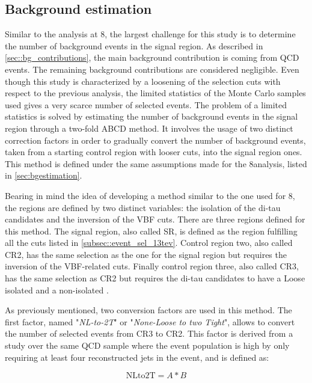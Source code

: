 \subsection{Background estimation}

Similar to the analysis at 8\tev, the largest challenge for this study is to determine the number of background events in the signal region. As described in \autoref{sec::bg_contributions}, the main background contribution is coming from QCD events. The remaining background contributions are considered negligible. Even though this study is characterized by a loosening of the selection cuts with respect to the previous analysis, the limited statistics of the Monte Carlo samples used gives a very scarce number of selected events. The problem of a limited statistics is solved by estimating the number of background events in the signal region through a two-fold ABCD method. It involves the usage of two distinct correction factors in order to gradually convert the number of background events, taken from a starting control region with looser cuts, into the signal region ones. This method is defined under the same assumptions made for the 8\tev analysis, listed in \autoref{sec:bgestimation}.

Bearing in mind the idea of developing a method similar to the one used for 8\tev, the regions are defined by two distinct variables: the isolation of the di-tau candidates and the inversion of the VBF cuts. There are three regions defined for this method. The signal region, also called SR, is defined as the region fulfilling all the cuts listed in \autoref{subsec::event_sel_13tev}. Control region two, also called CR2, has the same selection as the one for the signal region but requires the inversion of the VBF-related cuts. Finally control region three, also called CR3, has the same selection as CR2 but requires the di-tau candidates to have a Loose isolated and a non-isolated \hadtau.

As previously mentioned, two conversion factors are used in this method. The first factor, named "\textit{NL-to-2T}" or "\textit{None-Loose to two Tight}", allows to convert the number of selected events from CR3 to CR2. This factor is derived from a study over the same QCD sample where the event population is high by only requiring at least four reconstructed jets in the event, and is defined as:

\begin{equation}
\text{NLto2T} = A * B
\end{equation}

